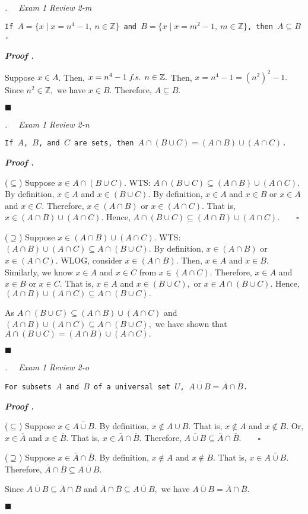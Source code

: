 \documentclass[11pt,letter]{article}
\newcounter{nq}[section]
\newcounter{np}[section]
\newenvironment*{p}{\par\noindent\textbf{\textit{Proof \stepcounter{np}\thenp. }}\par}{\par\hfill $\blacksquare$\par}
\newenvironment*{q}[1]{\noindent\emph{\thesection.\stepcounter{nq}\thenq$\quad $ #1}\par\noindent\texttt}{}
\def\Z{{\mathbb{Z}}}
\def\fs{\emph{ f.s. }}
\begin{document}
\begin{framed}\begin{q}
	{Exam 1 Review 2-m}
	{If $A=\{x\mid x=n^4-1,\ n\in\Z\}$ and $B=\{x\mid x=m^2-1,\ m\in\Z\}$, then $A\subseteq B$.}
\end{q}\end{framed}
\begin{p}
	Suppose $x\in A$. Then, $x=n^4-1\fs n\in\Z.$ Then, $x=n^4-1=(n^2)^2-1.$ Since $n^2\in\Z,$ we have $x\in B.$ Therefore, $A\subseteq B.$	
\end{p}

\begin{framed}\begin{q}
	{Exam 1 Review 2-n}
	{If $A$, $B$, and $C$ are sets, then $A\cap(B\cup C)=(A\cap B)\cup(A\cap C)$.}
\end{q}\end{framed}
\begin{p}
	($\subseteq$) Suppose $x\in A\cap(B\cup C).$ WTS: $A\cap(B\cup C)\subseteq(A\cap B)\cup(A\cap C).$ By definition, $x\in A$ and $x\in(B\cup C)$. By definition, $x\in A$ and $x\in B$ or $x\in A$ and $x\in C.$ Therefore, $x\in(A\cap B)$ or $x\in(A\cap C).$ That is, $x\in(A\cap B)\cup(A\cap C).$ Hence, $A\cap(B\cup C)\subseteq(A\cap B)\cup(A\cap C).\qquad\square$\par 
	($\supseteq$) Suppose $x\in(A\cap B)\cup(A\cap C).$ WTS: $(A\cap B)\cup(A\cap C)\subseteq A\cap(B\cup C).$ By definition, $x\in(A\cap B)$ or $x\in(A\cap C).$ WLOG, consider $x\in(A\cap B).$ Then, $x\in A$ and $x\in B.$ Similarly, we know $x\in A$ and $x\in C$ from $x\in(A\cap C).$ Therefore, $x\in A$ and $x\in B$ or $x\in C.$ That is, $x\in A$ and $x\in(B\cup C),$ or $x\in A\cap(B\cup C).$ Hence, $(A\cap B)\cup(A\cap C)\subseteq A\cap(B\cup C).$\par 
	As $A\cap(B\cup C)\subseteq(A\cap B)\cup(A\cap C)$ and $(A\cap B)\cup(A\cap C)\subseteq A\cap(B\cup C),$ we have shown that $A\cap(B\cup C)=(A\cap B)\cup(A\cap C).$
\end{p}

\begin{framed}\begin{q}
	{Exam 1 Review 2-o}
	{For subsets $A$ and $B$ of a universal set $U$, $\overline{A\cup B}=\overline{A}\cap\overline{B}$.}
\end{q}\end{framed}
\begin{p}
	($\subseteq$) Suppose $x\in\overline{A\cup B}.$ By definition, $x\notin A\cup B$. That is, $x\notin A$ and $x\notin B.$ Or, $x\in\overline{A}$ and $x\in\overline{B}.$ That is, $x\in\overline{A}\cap\overline{B}.$ Therefore, $\overline{A\cup B}\subseteq\overline{A}\cap\overline{B}.\qquad\square$\par 
	($\supseteq$) Suppose $x\in\overline{A}\cap\overline{B}.$ By definition, $x\notin A$ and $x\notin B$. That is, $x\in\overline{A\cup B}.$ Therefore, $\overline{A}\cap\overline{B}\subseteq\overline{A\cup B}.$\par 
	Since $\overline{A\cup B}\subseteq\overline{A}\cap\overline{B}$ and $\overline{A}\cap\overline{B}\subseteq\overline{A\cup B},$ we have $\overline{A\cup B}=\overline{A}\cap\overline{B}.$
\end{p}
\end{document}
